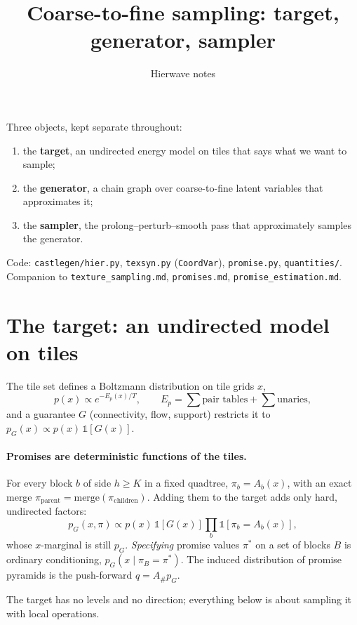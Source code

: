 \documentclass[11pt]{article}
\title{Coarse-to-fine sampling: target, generator, sampler}
\author{Hierwave notes}
\date{}
\newcommand{\1}{\mathds{1}}
\begin{document}
\maketitle

\noindent Three objects, kept separate throughout:
\begin{enumerate}
  \item the \textbf{target}, an undirected energy model on tiles that says what we want to sample;
  \item the \textbf{generator}, a chain graph over coarse-to-fine latent variables that approximates it;
  \item the \textbf{sampler}, the prolong--perturb--smooth pass that approximately samples the generator.
\end{enumerate}
Code: \texttt{castlegen/hier.py}, \texttt{texsyn.py} (\texttt{CoordVar}), \texttt{promise.py},
\texttt{quantities/}. Companion to \texttt{texture\_sampling.md}, \texttt{promises.md},
\texttt{promise\_estimation.md}.

\section{The target: an undirected model on tiles}

The tile set defines a Boltzmann distribution on tile grids $x$,
\[
  p(x) \propto e^{-E_p(x)/T}, \qquad E_p = \textstyle\sum \text{pair tables} + \sum \text{unaries},
\]
and a guarantee $G$ (connectivity, flow, support) restricts it to
$p_G(x) \propto p(x)\,\1[G(x)]$.

\paragraph{Promises are deterministic functions of the tiles.} For every block $b$ of side
$h \ge K$ in a fixed quadtree, $\pi_b = A_b(x)$, with an exact merge
$\pi_{\text{parent}} = \mathrm{merge}(\pi_{\text{children}})$. Adding them to the target
adds only hard, undirected factors:
\[
  p_G(x,\pi) \propto p(x)\,\1[G(x)] \prod_b \1[\pi_b = A_b(x)] ,
\]
whose $x$-marginal is still $p_G$. \emph{Specifying} promise values $\pi^*$ on a set of
blocks $B$ is ordinary conditioning, $p_G(x \mid \pi_B = \pi^*)$. The induced distribution
of promise pyramids is the push-forward $q = A_\# p_G$.

The target has no levels and no direction; everything below is about sampling it with local
operations.
\end{document}
